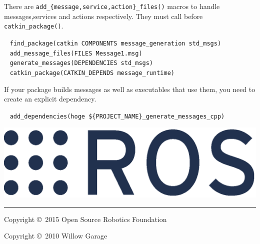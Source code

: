 \documentclass[10pt,landscape]{article}
\newif\ifcatkin
\begin{document}
\begin{multicols}{3}
There are \texttt{add\_\{message,service,action\}\_files()}
macros to handle messages,services and actions
respectively. They must call before \texttt{catkin\_package()}.
\vspace{-1.5mm}
{
\begin{tabbing}
~ \texttt{find\_package(catkin COMPONENTS message\_generation std\_msgs)}\\
~ \texttt{add\_message\_files(FILES Message1.msg)}\\
~ \texttt{generate\_messages(DEPENDENCIES std\_msgs)}\\
~ \texttt{catkin\_package(CATKIN\_DEPENDS message\_runtime)}\\
\end{tabbing}
}
\vspace{-5mm}
If your package builds messages as well as executables that use them,
you need to create an explicit dependency.
\vspace{-2.5mm}
\begin{tabbing}
~ \texttt{add\_dependencies(hoge \$\{PROJECT\_NAME\}\_generate\_messages\_cpp)}\\
\end{tabbing}

\vspace{-5mm}


\else %

\vspace{17cm}

\fi %

\begin{flushright}
\includegraphics[height=.12\columnwidth]{ros_logo.eps}
\end{flushright}

\rule{0.3\linewidth}{0.25pt}

\scriptsize

Copyright \copyright\ 2015 Open Source Robotics Foundation

Copyright \copyright\ 2010 Willow Garage


\end{multicols}
\end{document}
